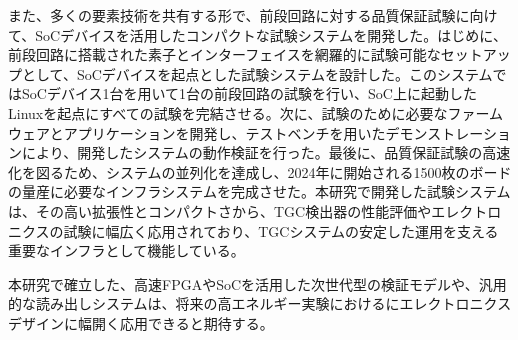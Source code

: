 また、多くの要素技術を共有する形で、前段回路に対する品質保証試験に向けて、SoCデバイスを活用したコンパクトな試験システムを開発した。はじめに、前段回路に搭載された素子とインターフェイスを網羅的に試験可能なセットアップとして、SoCデバイスを起点とした試験システムを設計した。このシステムではSoCデバイス1台を用いて1台の前段回路の試験を行い、SoC上に起動したLinuxを起点にすべての試験を完結させる。次に、試験のために必要なファームウェアとアプリケーションを開発し、テストベンチを用いたデモンストレーションにより、開発したシステムの動作検証を行った。最後に、品質保証試験の高速化を図るため、システムの並列化を達成し、2024年に開始される1500枚のボードの量産に必要なインフラシステムを完成させた。本研究で開発した試験システムは、その高い拡張性とコンパクトさから、TGC検出器の性能評価やエレクトロニクスの試験に幅広く応用されており、TGCシステムの安定した運用を支える重要なインフラとして機能している。

本研究で確立した、高速FPGAやSoCを活用した次世代型の検証モデルや、汎用的な読み出しシステムは、将来の高エネルギー実験におけるにエレクトロニクスデザインに幅開く応用できると期待する。

